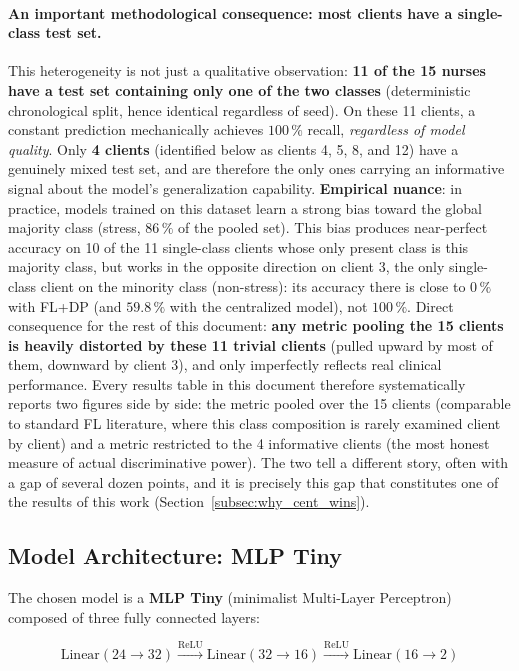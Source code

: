 \documentclass{article}
\begin{document}
\paragraph{An important methodological consequence: most clients have a
single-class test set.} This heterogeneity is not just a qualitative observation:
\textbf{11 of the 15 nurses have a test set containing only one of the two
classes} (deterministic chronological split, hence identical regardless of seed).
On these 11 clients, a constant prediction mechanically achieves $100\,\%$ recall,
\emph{regardless of model quality}. Only \textbf{4 clients} (identified below as
clients 4, 5, 8, and 12) have a genuinely mixed test set, and are therefore the
only ones carrying an informative signal about the model's generalization
capability. \textbf{Empirical nuance}: in practice, models trained on this dataset
learn a strong bias toward the global majority class (stress, $86\,\%$ of the
pooled set). This bias produces near-perfect accuracy on 10 of the 11 single-class
clients whose only present class is this majority class, but works in the opposite
direction on client 3, the only single-class client on the minority class
(non-stress): its accuracy there is close to $0\,\%$ with FL+DP (and $59.8\,\%$
with the centralized model), not $100\,\%$. Direct consequence for the rest of this
document: \textbf{any metric pooling the 15 clients is heavily distorted by these
11 trivial clients} (pulled upward by most of them, downward by client 3), and only
imperfectly reflects real clinical performance. Every results table in this
document therefore systematically reports two figures side by side: the metric
pooled over the 15 clients (comparable to standard FL literature, where this class
composition is rarely examined client by client) and a metric restricted to the 4
informative clients (the most honest measure of actual discriminative power). The
two tell a different story, often with a gap of several dozen points, and it is
precisely this gap that constitutes one of the results of this work
(Section~\ref{subsec:why_cent_wins}).

\subsection{Model Architecture: MLP Tiny}
\label{subsec:model}

The chosen model is a \textbf{MLP Tiny} (minimalist Multi-Layer Perceptron)
composed of three fully connected layers:

\begin{equation}
  \text{Linear}(24 \to 32) \xrightarrow{\text{ReLU}}
  \text{Linear}(32 \to 16) \xrightarrow{\text{ReLU}}
  \text{Linear}(16 \to 2)
  \label{eq:mlp}
\end{equation}
\end{document}
